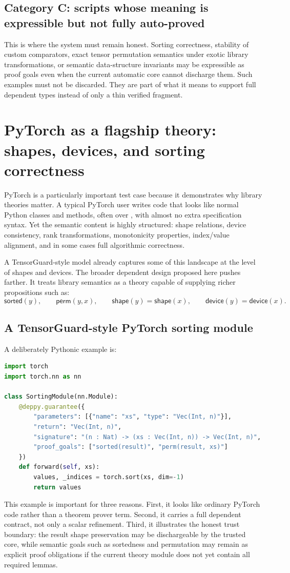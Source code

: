 \documentclass[11pt]{article}
\newcommand{\py}[1]{\texttt{\detokenize{#1}}}
\theoremstyle{definition}
\theoremstyle{plain}
\begin{document}
\subsection{Category C: scripts whose meaning is expressible but not fully auto-proved}
This is where the system must remain honest. Sorting correctness, stability of
custom comparators, exact tensor permutation semantics under exotic library
transformations, or semantic data-structure invariants may be expressible as
proof goals even when the current automatic core cannot discharge them. Such
examples must not be discarded. They are part of what it means to support full
dependent types instead of only a thin verified fragment.



\section{PyTorch as a flagship theory: shapes, devices, and sorting correctness}

PyTorch is a particularly important test case because it demonstrates why
library theories matter. A typical PyTorch user writes code that looks like
normal Python classes and methods, often over \py{nn.Module}, with almost no
extra specification syntax. Yet the semantic content is highly structured: shape
relations, device consistency, rank transformations, monotonicity properties,
index/value alignment, and in some cases full algorithmic correctness.

A TensorGuard-style model already captures some of this landscape at the level
of shapes and devices. The broader dependent design proposed here pushes farther.
It treats library semantics as a theory capable of supplying richer propositions
such as:
\[
\mathsf{sorted}(y), \qquad \mathsf{perm}(y,x), \qquad
\mathsf{shape}(y)=\mathsf{shape}(x), \qquad
\mathsf{device}(y)=\mathsf{device}(x).
\]

\subsection{A TensorGuard-style PyTorch sorting module}
A deliberately Pythonic example is:
\begin{lstlisting}[style=deppy,language=Python]
import torch
import torch.nn as nn

class SortingModule(nn.Module):
    @deppy.guarantee({
        "parameters": [{"name": "xs", "type": "Vec(Int, n)"}],
        "return": "Vec(Int, n)",
        "signature": "(n : Nat) -> (xs : Vec(Int, n)) -> Vec(Int, n)",
        "proof_goals": ["sorted(result)", "perm(result, xs)"]
    })
    def forward(self, xs):
        values, _indices = torch.sort(xs, dim=-1)
        return values
\end{lstlisting}
This example is important for three reasons. First, it looks like ordinary
PyTorch code rather than a theorem prover term. Second, it carries a full
dependent contract, not only a scalar refinement. Third, it illustrates the
honest trust boundary: the result shape preservation may be dischargeable by the
trusted core, while semantic goals such as sortedness and permutation may remain
as explicit proof obligations if the current theory module does not yet contain
all required lemmas.
\end{document}
